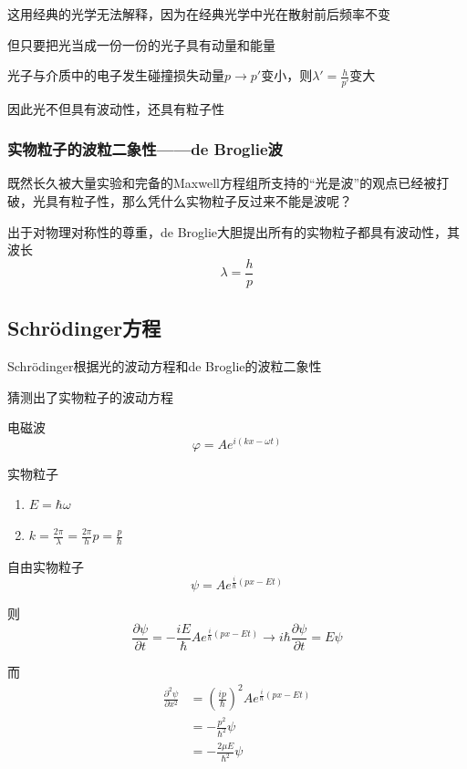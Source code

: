 \documentclass[lang=cn,10pt]{elegantbook}
\begin{document}
这用经典的光学无法解释，因为在经典光学中光在散射前后频率不变

但只要把光当成一份一份的光子具有动量和能量

光子与介质中的电子发生碰撞损失动量$p\rightarrow p'$变小，则$\lambda'=\frac{h}{p'}$变大

因此光不但具有波动性，还具有粒子性

\subsubsection{实物粒子的波粒二象性——de Broglie波}
既然长久被大量实验和完备的Maxwell方程组所支持的“光是波”的观点已经被打破，光具有粒子性，那么凭什么实物粒子反过来不能是波呢？

出于对物理对称性的尊重，de Broglie大胆提出所有的实物粒子都具有波动性，其波长
\[
\lambda=\frac{h}{p}
\]
\subsection{Schrödinger方程}
Schrödinger根据光的波动方程和de Broglie的波粒二象性

猜测出了实物粒子的波动方程

电磁波
\begin{equation}
	\varphi =Ae^{i\left( kx-\omega t \right)}
\end{equation}

实物粒子
\begin{enumerate}
	\item $E=\hbar\omega$
	\item $k=\frac{2\pi}{\lambda}=\frac{2\pi}{h}p=\frac{p}{\hbar}$
\end{enumerate}

自由实物粒子
\begin{equation}
	\psi =Ae^{\frac{i}{\hbar}\left( px-Et \right)}
\end{equation}

则
\begin{equation}
	\frac{\partial \psi}{\partial t}=-\frac{iE}{\hbar}Ae^{\frac{i}{\hbar}\left( px-Et \right)}\rightarrow i\hbar \frac{\partial \psi}{\partial t}=E\psi 
\end{equation}

而
\begin{equation}
	\begin{split}
		\frac{\partial ^2\psi}{\partial x^2}&=\left( \frac{ip}{\hbar} \right) ^2Ae^{\frac{i}{\hbar}\left( px-Et \right)}
		\\
		&=-\frac{p^2}{\hbar^2}\psi 
		\\
		&=-\frac{2\mu E}{\hbar^2}\psi 
	\end{split}
\end{equation}
\end{document}
